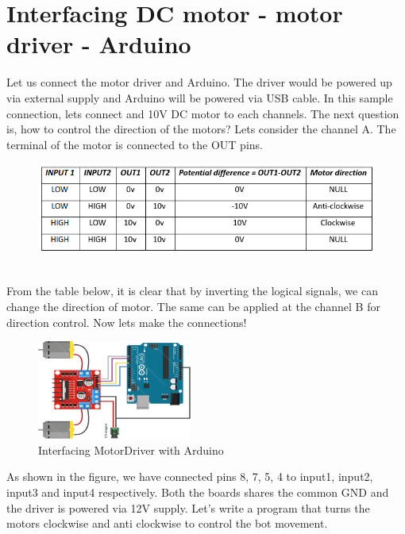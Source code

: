 \section{Interfacing DC motor - motor driver - Arduino}
\label{section:bot_interface}

Let us connect the motor driver and Arduino. The driver would be powered up via external supply and Arduino will be powered via USB cable. In this sample connection, lets connect and 10V DC motor to each channels. The next question is, how to control the direction of the motors? Lets consider the channel A. The terminal of the motor is connected to the OUT pins.
\begin{figure}
    \centering
    \includegraphics{Chapters/images/md1.png}
\end{figure}
\\ From the table below, it is clear that by inverting the logical signals, we can change the direction of motor. The same can be applied at the channel B for direction control. Now lets make the connections!

\begin{figure}
    \centering
    \includegraphics[width=2in]{Chapters/images/MotorDriver_circuit1.png}
    \caption{Interfacing MotorDriver with Arduino}
\end{figure}

As shown in the figure, we have connected pins 8, 7, 5, 4 to input1, input2, input3 and input4 respectively. Both the boards shares the common GND and the driver is powered via 12V supply. Let’s write a program that turns the motors clockwise and anti clockwise to control the bot movement.\\

